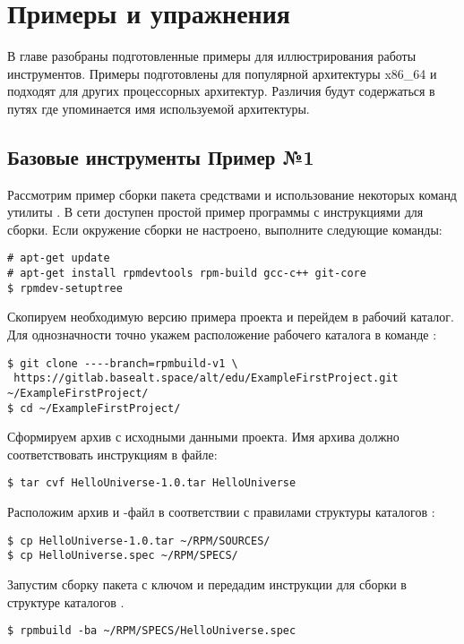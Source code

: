\chapter{Примеры и упражнения}

В главе разобраны подготовленные примеры для иллюстрирования работы инструментов.
Примеры подготовлены для популярной архитектуры x86\_64 и подходят для других
процессорных архитектур. Различия будут содержаться в путях где упоминается имя
используемой архитектуры.

\section{Базовые инструменты  \textbf{Пример №1}}

Рассмотрим пример сборки пакета средствами  и использование
некоторых команд утилиты . В сети доступен простой пример 
программы с инструкциями для сборки.
Если окружение сборки  не настроено, выполните следующие команды:
\begin{verbatim}
# apt-get update
# apt-get install rpmdevtools rpm-build gcc-c++ git-core
$ rpmdev-setuptree
\end{verbatim}

Скопируем необходимую версию примера проекта и перейдем
в рабочий каталог. Для однозначности точно укажем расположение рабочего
каталога  в команде :
\begin{verbatim}
$ git clone ----branch=rpmbuild-v1 \
 https://gitlab.basealt.space/alt/edu/ExampleFirstProject.git ~/ExampleFirstProject/
$ cd ~/ExampleFirstProject/
\end{verbatim}

Сформируем  архив с исходными данными проекта. Имя архива должно
соответствовать инструкциям в \Sys{.spec} файле:
\begin{verbatim}
$ tar cvf HelloUniverse-1.0.tar HelloUniverse
\end{verbatim}

Расположим архив и -файл в соответствии с правилами структуры каталогов
\Sys{RPM}:
\begin{verbatim}
$ cp HelloUniverse-1.0.tar ~/RPM/SOURCES/
$ cp HelloUniverse.spec ~/RPM/SPECS/
\end{verbatim}

Запустим сборку пакета с ключом  и передадим инструкции для сборки
в структуре каталогов \Sys{RPM}.
\begin{verbatim}
$ rpmbuild -ba ~/RPM/SPECS/HelloUniverse.spec
\end{verbatim}

